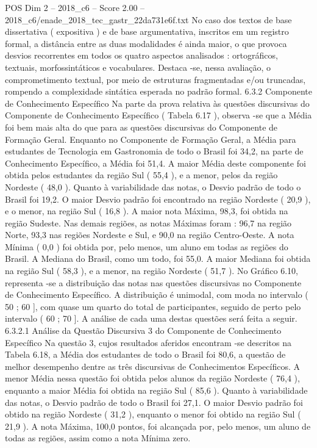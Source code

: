 \begin{textsample}{POS Dim 2 – 2018\_c6 – Score 2.00 – 2018\_c6/enade\_2018\_tec\_gastr\_22da731e6f.txt}
No caso dos textos de base dissertativa ( expositiva ) e de base argumentativa, inscritos em um registro formal, a distância entre as duas modalidades é ainda maior, o que provoca desvios recorrentes em todos os quatro aspectos analisados : ortográficos, textuais, morfossintáticos e vocabulares.
Destaca -se, nessa avaliação, o comprometimento textual, por meio de estruturas fragmentadas e/ou truncadas, rompendo a complexidade sintática esperada no padrão formal. 6.3.2 Componente de Conhecimento Específico Na parte da prova relativa às questões discursivas do Componente de Conhecimento Específico ( Tabela 6.17 ), observa -se que a Média foi bem mais alta do que para as questões discursivas do Componente de Formação Geral.
Enquanto no Componente de Formação Geral, a Média para estudantes de Tecnologia em Gastronomia de todo o Brasil foi 34,2, na parte de Conhecimento Específico, a Média foi 51,4.
A maior Média deste componente foi obtida pelos estudantes da região Sul ( 55,4 ), e a menor, pelos da região Nordeste ( 48,0 ).
Quanto à variabilidade das notas, o Desvio padrão de todo o Brasil foi 19,2.
O maior Desvio padrão foi encontrado na região Nordeste ( 20,9 ), e o menor, na região Sul ( 16,8 ).
A maior nota Máxima, 98,3, foi obtida na região Sudeste.
Nas demais regiões, as notas Máximas foram : 96,7 na região Norte, 93,3 nas regiões Nordeste e Sul, e 90,0 na região Centro-Oeste.
A nota Mínima ( 0,0 ) foi obtida por, pelo menos, um aluno em todas as regiões do Brasil.
A Mediana do Brasil, como um todo, foi 55,0.
A maior Mediana foi obtida na região Sul ( 58,3 ), e a menor, na região Nordeste ( 51,7 ).
No Gráfico 6.10, representa -se a distribuição das notas nas questões discursivas no Componente de Conhecimento Específico.
A distribuição é unimodal, com moda no intervalo ( 50 ; 60 ], com quase um quarto do total de participantes, seguido de perto pelo intervalo ( 60 ; 70 ].
A análise de cada uma destas questões será feita a seguir. 6.3.2.1 Análise da Questão Discursiva 3 do Componente de Conhecimento Específico Na questão 3, cujos resultados aferidos encontram -se descritos na Tabela 6.18, a Média dos estudantes de todo o Brasil foi 80,6, a questão de melhor desempenho dentre as três discursivas de Conhecimentos Específicos.
A menor Média nessa questão foi obtida pelos alunos da região Nordeste ( 76,4 ), enquanto a maior Média foi obtida na região Sul ( 85,6 ).
Quanto à variabilidade das notas, o Desvio padrão de todo o Brasil foi 27,1.
O maior Desvio padrão foi obtido na região Nordeste ( 31,2 ), enquanto o menor foi obtido na região Sul ( 21,9 ).
A nota Máxima, 100,0 pontos, foi alcançada por, pelo menos, um aluno de todas as regiões, assim como a nota Mínima zero.

\end{textsample}

